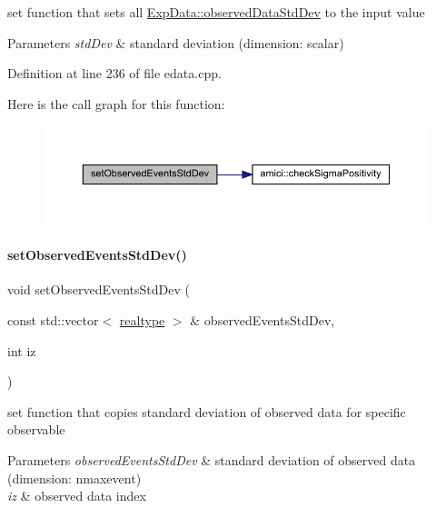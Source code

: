 set function that sets all \mbox{\hyperlink{classamici_1_1_exp_data_aa097568cebb4be48c4c1dfaab0c2a159}{Exp\+Data\+::observed\+Data\+Std\+Dev}} to the input value


\begin{DoxyParams}{Parameters}
{\em std\+Dev} & standard deviation (dimension\+: scalar) \\
\hline
\end{DoxyParams}


Definition at line 236 of file edata.\+cpp.

Here is the call graph for this function\+:
\nopagebreak
\begin{figure}[H]
\begin{center}
\leavevmode
\includegraphics[width=350pt]{classamici_1_1_exp_data_a7be54ad0b0116325f4955f10a759a018_cgraph}
\end{center}
\end{figure}
\mbox{\label{classamici_1_1_exp_data_a9fe1de066fcba20ce994d9817442a826}} 
\paragraph{\texorpdfstring{setObservedEventsStdDev()}{setObservedEventsStdDev()}\hspace{0.1cm}{\footnotesize\ttfamily [3/4]}}
{\footnotesize\ttfamily void set\+Observed\+Events\+Std\+Dev (\begin{DoxyParamCaption}\item[{const std\+::vector$<$ \mbox{\hyperlink{namespaceamici_a1bdce28051d6a53868f7ccbf5f2c14a3}{realtype}} $>$ \&}]{observed\+Events\+Std\+Dev,  }\item[{int}]{iz }\end{DoxyParamCaption})}

set function that copies standard deviation of observed data for specific observable


\begin{DoxyParams}{Parameters}
{\em observed\+Events\+Std\+Dev} & standard deviation of observed data (dimension\+: nmaxevent) \\
\hline
{\em iz} & observed data index \\
\hline
\end{DoxyParams}


